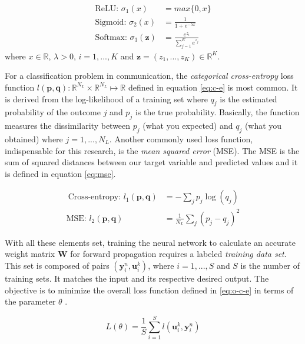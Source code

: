 \documentclass[conference]{IEEEtran}
\begin{document}
\begin{align}
	\text{ReLU: } \sigma_1 (x)& = max\{0, x\} \label{eq:relu}\\ 
	\text{Sigmoid: } \sigma_2 (x)& = \frac{1}{1+e^{- \lambda x}} \label{eq:sig}\\
	\text{Softmax: } \sigma_3 (\textbf{z})& = \frac{e^{z_i}}{\sum_{j=1}^{K}e^{z_j}}\label{eq:soft}
\end{align}
where $x \in \mathbb{R}$, $\lambda>0$, $i = 1,...,K$ and $\textbf{z} = (z_1,...,z_K) \in \mathbb{R}^K$.

For a classification problem in communication, the \textit{categorical cross-entropy} loss function $l(\textbf{p},\textbf{q}):\mathbb{R} ^{N_L}\times \mathbb{R} ^{N_L}\mapsto \mathbb{R}$ defined in equation \eqref{eq:c-e} is most common. It is derived from the log-likelihood of a training set where $q_j$ is the estimated probability of the outcome $j$ and $p_{j}$ is the true probability. Basically, the function measures the dissimilarity between $p_{j}$ (what you expected) and $q_{j}$ (what you obtained) \cite{murphy2013machine} where $j=1,...,N_L$. Another commonly used loss function, indispensable for this research, is the \textit{mean squared error} (MSE). The MSE is the  sum of squared distances between our target variable and predicted values and it is defined in equation \ref{eq:mse}. 

\begin{align}
\
	\text{Cross-entropy: }l_1(\textbf{p},\textbf{q}) &=-\sum _{j}p_{j}\log \left( q_{j}\right)\label{eq:c-e} \\
	\text{MSE: } l_2(\textbf{p},\textbf{q}) &=\frac{1}{N_L}\sum _{j}(p_{j}-q_{j})^{2} \label{eq:mse}
\end{align}

With all these elements set, training the neural network to calculate an accurate weight matrix $\textbf{W}$ for forward propagation requires a labeled \textit{training data set}. This set is composed of pairs $ (\textbf{y}_{i}^{n}, {\mathbf{u}}_i^k) $, where $i=1,...,S$ and $S$ is the number of training sets. It matches the input and its respective desired output. The objective is to minimize the overall loss function defined in \eqref{eq:o-c-e} in terms of the parameter $\theta$ \cite{DBLP:journals/corr/OSheaH17}. 

\begin{equation}\label{eq:o-c-e}
L\left( \theta \right) =\dfrac {1}{S}\sum ^{S}_{i=1}l\left({\mathbf{u}}_i^k  , \textbf{y}_{i}^{n}\right)	
\end{equation}  
\end{document}
